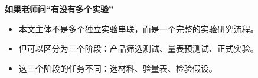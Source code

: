 \documentclass[aspectratio=169,UTF8,zihao=-4]{ctexbeamer}
\newcommand{\bigidea}[1]{
  \begin{center}
    \vspace{0.8em}
    {\LARGE \bfseries #1}
    \vspace{0.6em}
  \end{center}
}
\begin{document}
\begin{frame}
  \bigidea{如果老师问“有没有多个实验”}
  \begin{itemize}
    \item \Large 本文主体不是多个独立实验串联，而是一个完整的实验研究流程。
    \item \Large 但可以区分为三个阶段：产品筛选测试、量表预测试、正式实验。
    \item \Large 这三个阶段的任务不同：选材料、验量表、检验假设。
  \end{itemize}
\end{frame}
\end{document}
